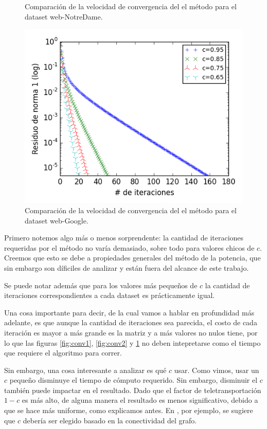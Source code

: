 \begin{figure}[H]
\begin{minipage}{0.48\textwidth}
  \caption{\footnotesize{Comparación de la velocidad de convergencia del el método para el dataset web-NotreDame.}}
  \label{fig:conv2}
\end{minipage}
\begin{minipage}{0.5\textwidth}
  \centering
    \includegraphics[width=1\textwidth]{imgs/convergencia-google.png}
  \caption{\footnotesize{Comparación de la velocidad de convergencia del el método para el dataset web-Google.}}
  \label{fig:conv3}
\end{minipage}
\end{figure}


Primero notemos algo más o menos sorprendente: la cantidad de iteraciones requeridas por el método no varía demasiado, sobre todo para valores chicos de $c$. Creemos que esto se debe a propiedades generales del método de la potencia, que sin embargo son díficiles de analizar y están fuera del alcance de este trabajo.

Se puede notar además que para los valores más pequeños de $c$ la cantidad de iteraciones correspondientes a cada dataset es prácticamente igual.

Una cosa importante para decir, de la cual vamos a hablar en profundidad más adelante, es que aunque la cantidad de iteraciones sea parecida, el costo de cada iteración es mayor a más grande es la matriz y a más valores no nulos tiene, por lo que las figuras \ref{fig:conv1}, \ref{fig:conv2} y \ref{fig:conv3} no deben intepretarse como el tiempo que requiere el algoritmo para correr.

Sin embargo, una cosa interesante a analizar es qué $c$ usar. Como vimos, usar un $c$ pequeño disminuye el tiempo de cómputo requerido. Sin embargo, disminuir el $c$ también puede impactar en el resultado. Dado que el factor de teletransportación $1-c$ es más alto, de alguna manera el resultado es menos significativo, debido a que se hace más uniforme, como explicamos antes. 
En \cite{Chakrabarti}, por ejemplo, se sugiere que $c$ debería ser elegido basado en la conectividad del grafo.


